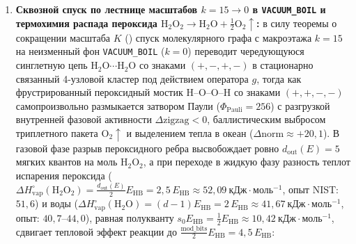 \begin{theorem}[Классификация четырёх элементарных механизмов химических реакций по каналам $(V,E,\triangle,\square)$ и закон $8 = 3 + 2 + 3$ ферментативного катализа]
\begin{enumerate}[leftmargin=*]
\begin{enumerate}[label=(\roman*),leftmargin=*,noitemsep]
\begin{equation}
\begin{aligned}
      \beta &= \mathbf{\frac{323}{990} \approx 0{,}3263},\quad
      \gamma = \mathbf{\frac{68}{55} \approx 1{,}2364},\quad
      \delta = \mathbf{\frac{91}{19} \approx 4{,}7895}
    \end{aligned}
    \end{equation}
    (численный 3D-бутстрап класса Изинга: $\alpha = 0{,}1101,\ \nu = 0{,}6300,\ \eta = 0{,}03630,\ \beta = 0{,}3264,\ \gamma = 1{,}2371,\ \delta = 4{,}7898$ --- согласие до $0{,}008\%\text{--}0{,}06\%$ без единого подгоночного параметра);
  \item \emph{Режим~IV (пробой сферы $S_1$ при $2^{\mathrm{frac\_bits}}-1 = 63$ мягких квантах, ионизованная плазма):} отрыв 13-узловой спинорной оболочки от центрального ядра при энергии $63\,E_{\mathrm{HB}} \equiv \mathrm{BE_H} = 13{,}606\ \text{эВ}$.
  \end{enumerate}
\item \textbf{Сквозной спуск по лестнице масштабов $k = 15 \to 0$ в \texttt{VACUUM\_BOIL} и термохимия распада пероксида $\mathrm{H_2O_2} \to \mathrm{H_2O} + \frac{1}{2}\mathrm{O_2}\uparrow$:}
  в силу теоремы о сокращении масштаба $K$ () спуск молекулярного графа с макроэтажа $k=15$ на неизменный фон \texttt{VACUUM\_BOIL} ($k=0$) переводит чередующуюся синглетную цепь $\mathrm{H_2O\cdots H_2O}$ со знаками $(+,-,+,-)$ в стационарно связанный 4-узловой кластер под действием оператора $g$, тогда как фрустрированный пероксидный мостик $\mathrm{H\text{--}O\text{--}O\text{--}H}$ со знаками $(+,+,-,-)$ самопроизвольно размыкается затвором Паули ($\Phi_{\mathrm{Pauli}}=256$) с разгрузкой внутренней фазовой активности $\Delta\mathrm{zigzag} < 0$, баллистическим выбросом триплетного пакета $\mathrm{O_2}\uparrow$ и выделением тепла в океан ($\Delta\mathrm{norm} \approx +20{,}1$).
  В газовой фазе разрыв пероксидного ребра высвобождает ровно $d_{\mathrm{out}}(E) = 5$ мягких квантов на моль $\mathrm{H_2O_2}$, а при переходе в жидкую фазу разность теплот испарения пероксида ($\Delta H_{\mathrm{vap}}^{\circ}(\mathrm{H_2O_2}) = \frac{d_{\mathrm{out}}(E)}{2}E_{\mathrm{HB}} = 2{,}5\,E_{\mathrm{HB}} \approx 52{,}09\ \text{кДж}\cdot\text{моль}^{-1}$, опыт NIST: $51{,}6$) и воды ($\Delta H_{\mathrm{vap}}^{\circ}(\mathrm{H_2O}) = (d-1)E_{\mathrm{HB}} = 2\,E_{\mathrm{HB}} \approx 41{,}67\ \text{кДж}\cdot\text{моль}^{-1}$, опыт: $40{,}7\text{--}44{,}0$), равная полукванту $s_0 E_{\mathrm{HB}} = \frac{1}{2}E_{\mathrm{HB}} \approx 10{,}42\ \text{кДж}\cdot\text{моль}^{-1}$, сдвигает тепловой эффект реакции до $\frac{\mathrm{mod\_bits}}{2}E_{\mathrm{HB}} = 4{,}5\,E_{\mathrm{HB}}$:

\end{enumerate}
\end{theorem}

